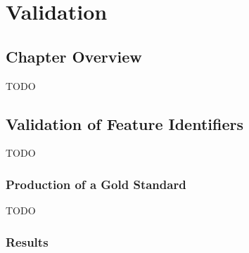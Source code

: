 \chapter{Validation}
\label{chap:validation}

\section{Chapter Overview}


TODO

\section{Validation of Feature Identifiers}

TODO

\subsection{Production of a Gold Standard}

TODO

\subsection{Results}

